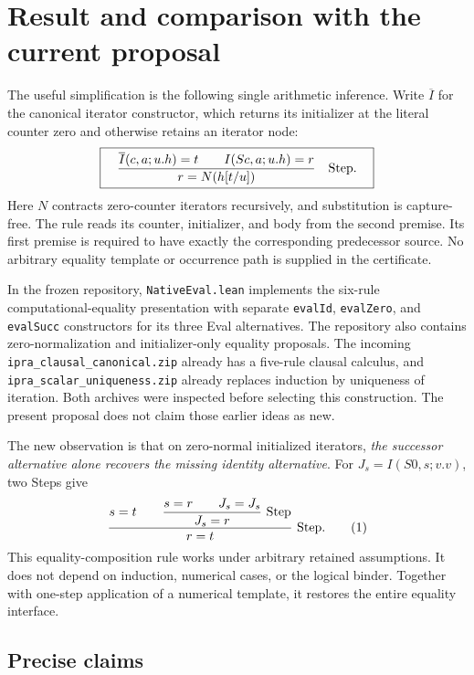 \documentclass[11pt,letterpaper]{article}
\theoremstyle{definition}
\begin{document}
\section{Result and comparison with the current proposal}

The useful simplification is the following single arithmetic inference.
Write \(\overline I\) for the canonical iterator constructor, which
returns its initializer at the literal counter zero and otherwise retains
an iterator node:
\[
 \boxed{\quad
 \frac{\overline I(c,a;u.h)=t\qquad I(Sc,a;u.h)=r}
      {r=N(h[t/u])}
 \quad\text{\rm Step}. \quad}
\]
Here \(N\) contracts zero-counter iterators recursively, and
substitution is capture-free. The rule reads its counter, initializer,
and body from the second premise. Its first premise is required to
have exactly the corresponding predecessor source. No arbitrary
equality template or occurrence path is supplied in the certificate.

In the frozen repository, \texttt{NativeEval.lean} implements the
six-rule computational-equality presentation with separate
\texttt{evalId}, \texttt{evalZero}, and \texttt{evalSucc} constructors
for its three Eval alternatives. The repository also contains
zero-normalization and initializer-only equality proposals.
The incoming \texttt{ipra\_clausal\_canonical.zip} already has a
five-rule clausal calculus, and
\texttt{ipra\_scalar\_uniqueness.zip} already replaces induction by
uniqueness of iteration. Both archives were inspected before selecting
this construction. The present proposal does not claim those earlier
ideas as new.

The new observation is that on zero-normal initialized iterators,
\emph{the successor alternative alone recovers the missing identity
alternative}. For \(J_s=I(S0,s;v.v)\), two Steps give
\[
 \frac{s=t\qquad
       \displaystyle\frac{s=r\qquad J_s=J_s}{J_s=r}\ {\rm Step}}
      {r=t}\ {\rm Step}.
 \tag{1}\label{eq:headline-pivot}
\]
This equality-composition rule works under arbitrary retained assumptions.
It does not depend on induction, numerical cases, or the logical binder.
Together with one-step application of a numerical template, it restores
the entire equality interface.

\subsection{Precise claims}
\end{document}
